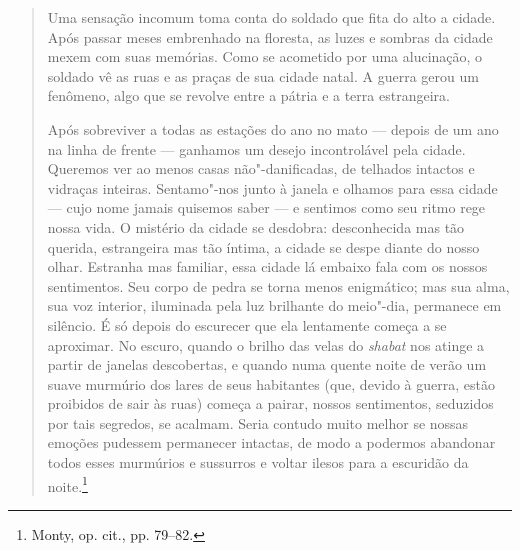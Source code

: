 \begin{quote}
Uma sensação incomum toma conta do soldado que fita do alto a cidade.
Após passar meses embrenhado na floresta, as luzes e sombras da cidade
mexem com suas memórias. Como se acometido por uma alucinação, o soldado
vê as ruas e as praças de sua cidade natal. A guerra gerou um fenômeno,
algo que se revolve entre a pátria e a terra estrangeira.

Após sobreviver a todas as estações do ano no mato --- depois de um ano na
linha de frente --- ganhamos um desejo incontrolável pela cidade. Queremos
ver ao menos casas não"-danificadas, de telhados intactos e vidraças
inteiras. Sentamo"-nos junto à janela e olhamos para essa cidade --- cujo
nome jamais quisemos saber --- e sentimos como seu ritmo rege nossa vida.
O mistério da cidade se desdobra: desconhecida mas tão querida,
estrangeira mas tão íntima, a cidade se despe diante do nosso olhar.
Estranha mas familiar, essa cidade lá embaixo fala com os nossos
sentimentos. Seu corpo de pedra se torna menos enigmático; mas sua alma,
sua voz interior, iluminada pela luz brilhante do meio"-dia, permanece em
silêncio. É só depois do escurecer que ela lentamente começa a se
aproximar. No escuro, quando o brilho das velas do \textit{shabat} nos atinge a
partir de janelas descobertas, e quando numa quente noite de verão um
suave murmúrio dos lares de seus habitantes (que, devido à guerra, estão
proibidos de sair às ruas) começa a pairar, nossos sentimentos,
seduzidos por tais segredos, se acalmam. Seria contudo muito melhor se
nossas emoções pudessem permanecer intactas, de modo a podermos
abandonar todos esses murmúrios e sussurros e voltar ilesos para a
escuridão da noite.\footnote{Monty, op. cit., pp. 79--82.}
\end{quote}


